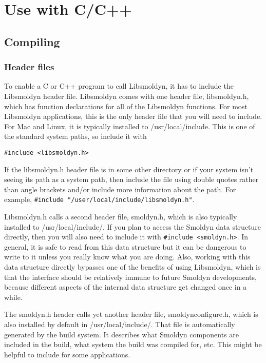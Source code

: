 \documentclass {scrbook}
\begin{document}
\section{Use with C/C++}

\subsection*{Compiling}

\subsubsection*{Header files}
To enable a C or C++ program to call Libsmoldyn, it has to include the Libsmoldyn header file. Libsmoldyn comes with one header file, libsmoldyn.h, which has function declarations for all of the Libsmoldyn functions. For most Libsmoldyn applications, this is the only header file that you will need to include. For Mac and Linux, it is typically installed to /usr/local/include. This is one of the standard system paths, so include it with

\begin{lstlisting}[style=SSAC]
#include <libsmoldyn.h>
\end{lstlisting}

If the libsmoldyn.h header file is in some other directory or if your system isn't seeing its path as a system path, then include the file using double quotes rather than angle brackets and/or include more information about the path. For example, \lstinline{#include "/user/local/include/libsmoldyn.h"}.

Libsmoldyn.h calls a second header file, smoldyn.h, which is also typically installed to /usr/local/include/. If you plan to access the Smoldyn data structure directly, then you will also need to include it with \lstinline{#include <smoldyn.h>}. In general, it is safe to read from this data structure but it can be dangerous to write to it unless you really know what you are doing. Also, working with this data structure directly bypasses one of the benefits of using Libsmoldyn, which is that the interface should be relatively immune to future Smoldyn developments, because different aspects of the internal data structure get changed once in a while.

The smoldyn.h header calls yet another header file, smoldynconfigure.h, which is also installed by default in /usr/local/include/. That file is automatically generated by the build system. It describes what Smoldyn components are included in the build, what system the build was compiled for, etc. This might be helpful to include for some applications.
\end{document}
